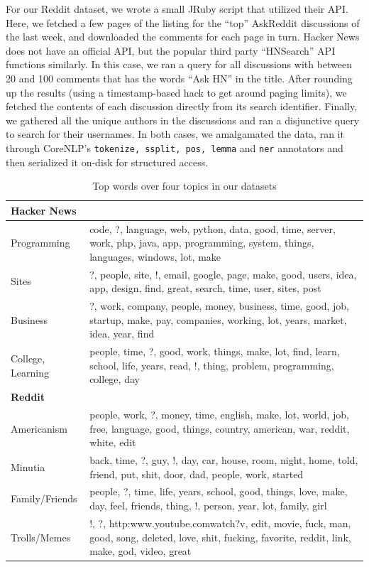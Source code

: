 \documentclass{article}
\begin{document}
For our Reddit dataset, we wrote a small JRuby script that utilized their API. Here,
we fetched a few pages of the listing for the ``top'' AskReddit discussions of the last
week, and downloaded the comments for each page in turn. Hacker News does not have
an official API, but the popular third party ``HNSearch'' API functions similarly.
In this case, we ran a query for all discussions with between 20 and 100 comments
that has the words ``Ask HN'' in the title. After rounding up the results (using
a timestamp-based hack to get around paging limits), we fetched the contents of
each discussion directly from its search identifier. Finally, we gathered all
the unique authors in the discussions and ran a disjunctive query to search for
their usernames. In both cases, we amalgamated the data, ran it through
CoreNLP's \texttt{tokenize, ssplit, pos, lemma} and \texttt{ner} annotators and
then serialized it on-disk for structured access.

\begin{table}[h]\footnotesize
  \begin{tabularx}{0.5\textwidth}{| l X |}
   \hline
   \textbf{Hacker News} & \\
   \hline
   Programming  & code, ?, language, web, python, data, good, time, server, work, php, java, app, programming, system, things, languages, windows, lot, make \\

  Sites  & ?, people, site, !, email, google, page, make, good, users, idea, app, design, find, great, search, time, user, sites, post \\

  Business  & ?, work, company, people, money, business, time, good, job, startup, make, pay, companies, working, lot, years, market, idea, year, find \\

  College,  Learning  & people, time, ?, good, work, things, make, lot, find, learn, school, life, years, read, !, thing, problem, programming, college, day \\
   \hline
   \textbf{Reddit} & \\
   \hline
  Americanism & people, work, ?, money, time, english, make, lot, world, job, free, language, good, things, country, american, war, reddit, white, edit \\

  Minutia & back, time, ?, guy, !, day, car, house, room, night, home, told, friend, put, shit, door, dad, people, work, started \\

  Family/Friends  & people, ?, time, life, years, school, good, things, love, make, day, feel, friends, thing, !, person, year, lot, family, girl \\

  Trolls/Memes  & !, ?, http:\/\/www.youtube.com\/watch?v, edit, movie, fuck, man, good, song, deleted, love, shit, fucking, favorite, reddit, link, make, god, video, great \\
   \hline
  \end{tabularx}
  \caption{Top words over four topics in our datasets}
  \label{table:lda}
\end{table}
\end{document}

